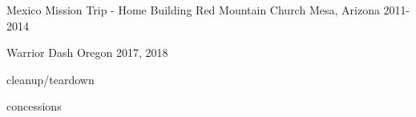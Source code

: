 

\begin{cventries}

  \cventry
    {Mexico Mission Trip - Home Building} %
    {Red Mountain Church} %
    {Mesa, Arizona} %
    {2011-2014} %
    {
    }

  \cventry
    {Warrior Dash} %
    {} %
    {Oregon} %
    {2017, 2018} %
    {
      \begin{cvitems} %
        \item {cleanup/teardown}
        \item {concessions}        
      \end{cvitems}
    }

\end{cventries}
